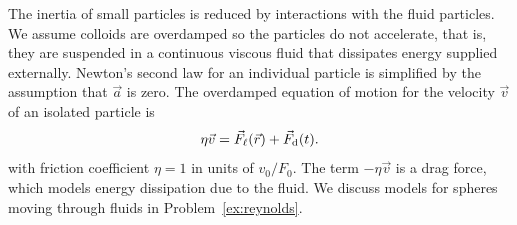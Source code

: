 \documentclass[preprint,showpacs,preprintnumbers,amsmath,amssymb,aps,prb]{revtex4-1}
\theoremstyle{remark}
\begin{document}
The inertia of 
small particles is reduced by interactions
with the fluid particles.\cite{Purcell1977}
We assume 
colloids are
overdamped
so the particles do not accelerate,
that is, they are suspended in a continuous viscous fluid
that dissipates energy supplied externally. 
Newton's second law for an individual particle
is simplified
by the assumption that $\vec{a}$ is zero. 
The overdamped equation of motion for
the velocity $\vec{v}$ of 
an isolated particle is
\begin{equation}
  \eta \vec{v} = \vec{F}_{\ell}(\vec{r}) + \vec{F}_{\rm d}(t).
    \label{eq:motion}
\end{equation}
with friction coefficient $\eta = 1$ in units of $v_0 / F_0$.
The term $-\eta \vec{v}$
is a drag force, which models
energy dissipation due to the fluid. 
We discuss  models for
spheres moving through fluids in 
Problem~\ref{ex:reynolds}. 
\end{document}
